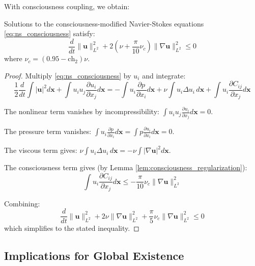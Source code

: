 With consciousness coupling, we obtain:

\begin{theorem}
\label{thm:enhanced_energy}
Solutions to the consciousness-modified Navier-Stokes equations \eqref{eq:ns_consciousness} satisfy:
\begin{equation}
\frac{d}{dt}\|\mathbf{u}\|_{L^2}^2 + 2\left(\nu + \frac{\pi}{10}\nu_c\right)\|\nabla \mathbf{u}\|_{L^2}^2 \leq 0
\end{equation}
where $\nu_c = (0.95 - \text{ch}_2)\nu$.
\end{theorem}

\begin{proof}
Multiply \eqref{eq:ns_consciousness} by $u_i$ and integrate:
\begin{equation}
\frac{1}{2}\frac{d}{dt}\int |\mathbf{u}|^2 d\mathbf{x} + \int u_i u_j \frac{\partial u_i}{\partial x_j} d\mathbf{x} = -\int u_i \frac{\partial p}{\partial x_i} d\mathbf{x} + \nu \int u_i \Delta u_i \, d\mathbf{x} + \int u_i \frac{\partial C_{ij}}{\partial x_j} d\mathbf{x}
\end{equation}

The nonlinear term vanishes by incompressibility: $\int u_i u_j \frac{\partial u_i}{\partial x_j} d\mathbf{x} = 0$.

The pressure term vanishes: $\int u_i \frac{\partial p}{\partial x_i} d\mathbf{x} = \int p \frac{\partial u_i}{\partial x_i} d\mathbf{x} = 0$.

The viscous term gives: $\nu \int u_i \Delta u_i \, d\mathbf{x} = -\nu \int |\nabla \mathbf{u}|^2 d\mathbf{x}$.

The consciousness term gives (by Lemma \ref{lem:consciousness_regularization}):
\begin{equation}
\int u_i \frac{\partial C_{ij}}{\partial x_j} d\mathbf{x} \leq -\frac{\pi}{10}\nu_c \|\nabla \mathbf{u}\|_{L^2}^2
\end{equation}

Combining:
\begin{equation}
\frac{d}{dt}\|\mathbf{u}\|_{L^2}^2 + 2\nu\|\nabla \mathbf{u}\|_{L^2}^2 + \frac{\pi}{5}\nu_c\|\nabla \mathbf{u}\|_{L^2}^2 \leq 0
\end{equation}
which simplifies to the stated inequality.
\end{proof}

\subsection{Implications for Global Existence}

